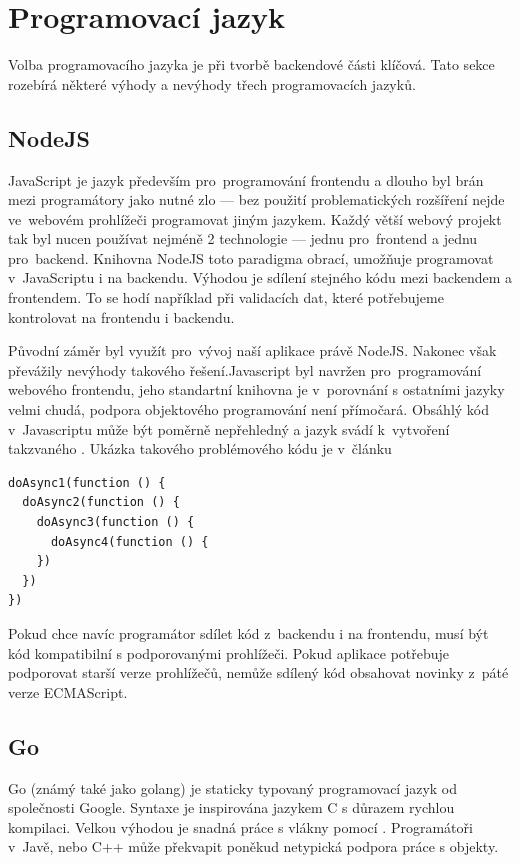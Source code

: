 \section{Programovací jazyk}

Volba programovacího jazyka je při tvorbě backendové části klíčová. Tato sekce rozebírá některé výhody a nevýhody třech programovacích jazyků.

\subsection{NodeJS}

JavaScript je jazyk především pro~programování frontendu a dlouho byl brán mezi programátory jako nutné zlo --- bez použití problematických rozšíření nejde ve~webovém prohlížeči programovat jiným jazykem. Každý větší webový projekt tak byl nucen používat nejméně 2 technologie --- jednu pro~frontend a jednu pro~backend. Knihovna NodeJS toto paradigma obrací, umožňuje programovat v~JavaScriptu i na backendu. Výhodou je sdílení stejného kódu mezi backendem a frontendem. To se hodí například při validacích dat, které potřebujeme kontrolovat na frontendu i backendu.

Původní záměr byl využít pro~vývoj naší aplikace právě NodeJS. Nakonec však převážily nevýhody takového řešení.Javascript byl navržen pro~programování webového frontendu, jeho standartní knihovna je v~porovnání s ostatními jazyky velmi chudá, podpora objektového programování není přímočará. Obsáhlý kód v~Javascriptu může být poměrně nepřehledný a jazyk svádí k~vytvoření takzvaného . Ukázka takového problémového kódu je v~článku \cite{callback}

\begin{lstlisting}
doAsync1(function () {
  doAsync2(function () {
    doAsync3(function () {
      doAsync4(function () {
    })
  })
})
\end{lstlisting}


 Pokud chce navíc programátor sdílet kód z~backendu i na frontendu, musí být kód kompatibilní s podporovanými prohlížeči. Pokud aplikace potřebuje podporovat starší verze prohlížečů, nemůže sdílený kód obsahovat novinky z~páté verze ECMAScript\cite{ecma}.

\subsection{Go}

Go (známý také jako golang)\cite{golang} je staticky typovaný programovací jazyk od společnosti Google. Syntaxe je inspirována jazykem C s důrazem rychlou kompilaci. Velkou výhodou je snadná práce s vlákny pomocí . Programátoři v~Javě, nebo C++ může překvapit poněkud netypická podpora práce s objekty.

